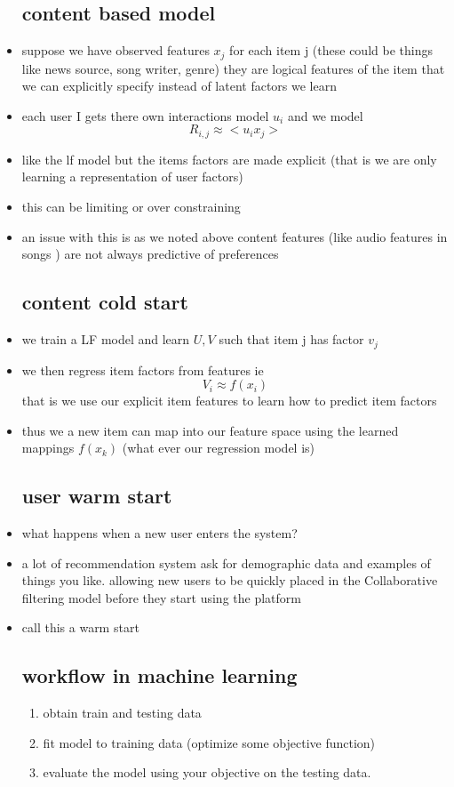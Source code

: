 \documentclass{article}
\begin{document}
\begin{itemize}
\subsection*{content based model}
\item suppose we have observed features $x_j$ for each item j (these could be things like news source, song writer, genre) they are logical features of the item that we can explicitly specify instead of latent factors we learn
\item each user I gets there own interactions model $u_{i}$ and we model $$R_{i,j}\approx <u_ix_j>$$
\item like the lf model but the items factors are made  explicit (that is we are only learning a representation of user factors)
\item this can be limiting or over constraining 
\item an issue with this is as we noted above content features (like audio features in songs ) are not always predictive of preferences
\subsection*{content cold start}
\item we train a LF model and learn $U,V$ such that item j has factor $v_j$
\item we then regress item factors from features ie $$V_{i}\approx f(x_i)$$ that is we use our explicit item features to learn how to predict item factors
\item thus we a new item can map into our feature space using the learned mappings $f(x_k)$ (what ever our regression model is)
\subsection*{user warm start }
\item what happens when a new user enters the system? 
\item a lot of recommendation system ask for demographic data and examples of things you like. allowing new users to be quickly placed in the Collaborative filtering model before they start using the platform 
\item call this a warm start 
\subsection*{workflow in machine learning }
\begin{enumerate}
    \item obtain train and testing data 
    \item fit model to training data (optimize some objective function)
    \item evaluate the model using your objective on the testing data.
\end{enumerate}

\end{itemize}
\end{document}
